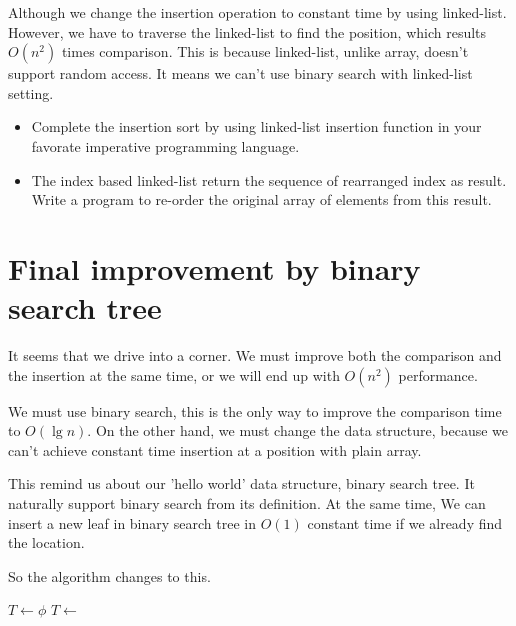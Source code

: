 \documentclass[UTF8]{article}
\begin{document}
Although we change the insertion operation to constant time by using
linked-list. However, we have to traverse the linked-list to find the
position, which results $O(n^2)$ times comparison. This is because
linked-list, unlike array, doesn't support random access. It means we
can't use binary search with linked-list setting.

\begin{Exercise}
\begin{itemize}
\item Complete the insertion sort by using linked-list insertion function
in your favorate imperative programming language.
\item The index based linked-list return the sequence of rearranged index
as result. Write a program to re-order the original array of elements from
this result.
\end{itemize}
\end{Exercise}


\section{Final improvement by binary search tree}

It seems that we drive into a corner. We must improve both the comparison
and the insertion at the same time, or we will end up with $O(n^2)$ performance.

We must use binary search, this is the only way to improve the comparison
time to $O(\lg n)$. On the other hand, we must change the data structure,
because we can't achieve constant time insertion at a position with
plain array.

This remind us about our 'hello world' data structure, binary search tree.
It naturally support binary search from its definition. At the same time,
We can insert a new leaf in binary search tree in $O(1)$ constant time
if we already find the location.

So the algorithm changes to this.

\begin{algorithmic}
  \State $T \gets \phi$
    \State $T \gets $ 
  \EndFor
  \State \Return {}
\EndFunction
\end{algorithmic}
\end{document}

